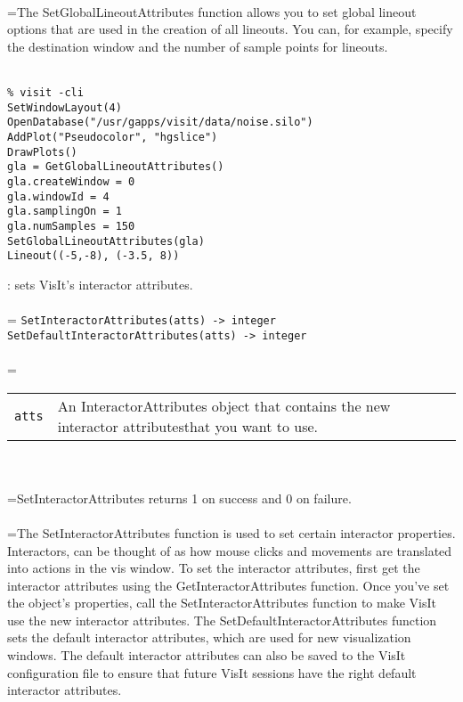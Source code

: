 \documentclass[10pt,a4paper]{report}
\begin{document}
 \\ 
\hangindent=\parindent The SetGlobalLineoutAttributes function allows you to set global lineout options that are used in the creation of all lineouts. You can, for example, specify the destination window and the number of sample points for lineouts. \\[-3mm] 

\\[-6mm]
\begin{verbatim}% visit -cli
SetWindowLayout(4)
OpenDatabase("/usr/gapps/visit/data/noise.silo")
AddPlot("Pseudocolor", "hgslice")
DrawPlots()
gla = GetGlobalLineoutAttributes()
gla.createWindow = 0
gla.windowId = 4
gla.samplingOn = 1
gla.numSamples = 150
SetGlobalLineoutAttributes(gla)
Lineout((-5,-8), (-3.5, 8))
\end{verbatim}
\newpage


{}
: sets VisIt's interactor attributes.\\[-3mm]

 \\ 
\hangindent=\parindent 
\verb!SetInteractorAttributes(atts) -> integer!\\ 
\verb!SetDefaultInteractorAttributes(atts) -> integer!\\ [-3mm]

 \\ 
\hangindent=\parindent 
\begin{tabular}{lp{9cm}}
\verb!atts! & An InteractorAttributes object that contains the new interactor attributesthat you want to use. \\
\end{tabular} \\[-2mm]


 \\ 
\hangindent=\parindent SetInteractorAttributes returns 1 on success and 0 on failure. \\[-3mm] 

 \\ 
\hangindent=\parindent The SetInteractorAttributes function is used to set certain interactor properties. Interactors, can be thought of as how mouse clicks and movements are translated into actions in the vis window. To set the interactor attributes, first get the interactor attributes using the GetInteractorAttributes function. Once you've set the object's properties, call the SetInteractorAttributes function to make VisIt use the new interactor attributes. The SetDefaultInteractorAttributes function sets the default interactor attributes, which are used for new visualization windows. The default interactor attributes can also be saved to the VisIt configuration file to ensure that future VisIt sessions have the right default interactor attributes. \\[-3mm] 
\end{document}
